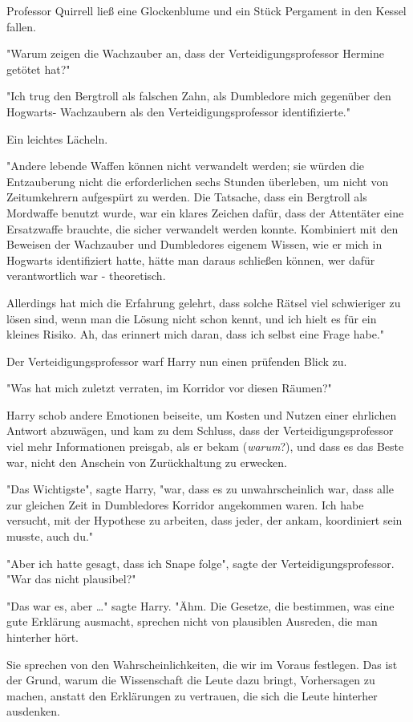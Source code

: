 {Professor Quirrell ließ eine Glockenblume und ein Stück Pergament in den Kessel fallen.

"Warum zeigen die Wachzauber an, dass der Verteidigungsprofessor Hermine getötet hat?"

"Ich trug den Bergtroll als falschen Zahn, als Dumbledore mich gegenüber den Hogwarts- Wachzaubern als den Verteidigungsprofessor identifizierte."

Ein leichtes Lächeln.

"Andere lebende Waffen können nicht verwandelt werden; sie würden die Entzauberung nicht die erforderlichen sechs Stunden überleben, um nicht von Zeitumkehrern aufgespürt zu werden. Die Tatsache, dass ein Bergtroll als Mordwaffe benutzt wurde, war ein klares Zeichen dafür, dass der Attentäter eine Ersatzwaffe brauchte, die sicher verwandelt werden konnte. Kombiniert mit den Beweisen der Wachzauber und Dumbledores eigenem Wissen, wie er mich in Hogwarts identifiziert hatte, hätte man daraus schließen können, wer dafür verantwortlich war - theoretisch.

Allerdings hat mich die Erfahrung gelehrt, dass solche Rätsel viel schwieriger zu lösen sind, wenn man die Lösung nicht schon kennt, und ich hielt es für ein kleines Risiko. Ah, das erinnert mich daran, dass ich selbst eine Frage habe."

Der Verteidigungsprofessor warf Harry nun einen prüfenden Blick zu.

"Was hat mich zuletzt verraten, im Korridor vor diesen Räumen?"

Harry schob andere Emotionen beiseite, um Kosten und Nutzen einer ehrlichen Antwort abzuwägen, und kam zu dem Schluss, dass der Verteidigungsprofessor viel mehr Informationen preisgab, als er bekam (\emph{warum}?), und dass es das Beste war, nicht den Anschein von Zurückhaltung zu erwecken.

"Das Wichtigste", sagte Harry, "war, dass es zu unwahrscheinlich war, dass alle zur gleichen Zeit in Dumbledores Korridor angekommen waren. Ich habe versucht, mit der Hypothese zu arbeiten, dass jeder, der ankam, koordiniert sein musste, auch du."

"Aber ich hatte gesagt, dass ich Snape folge", sagte der Verteidigungsprofessor. "War das nicht plausibel?"

"Das war es, aber …" sagte Harry. "Ähm. Die Gesetze, die bestimmen, was eine gute Erklärung ausmacht, sprechen nicht von plausiblen Ausreden, die man hinterher hört.

Sie sprechen von den Wahrscheinlichkeiten, die wir im Voraus festlegen. Das ist der Grund, warum die Wissenschaft die Leute dazu bringt, Vorhersagen zu machen, anstatt den Erklärungen zu vertrauen, die sich die Leute hinterher ausdenken.

}
